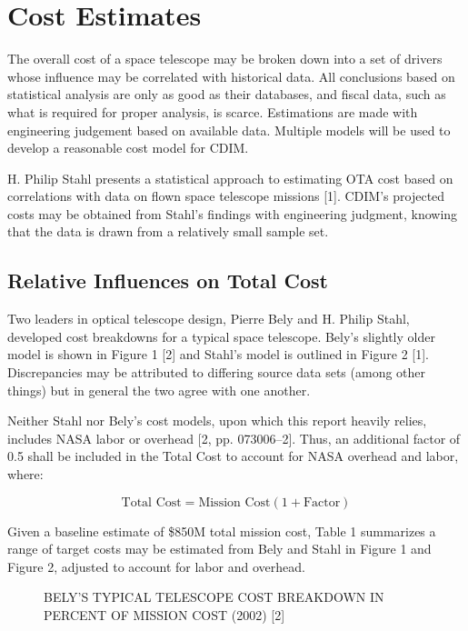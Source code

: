 \documentclass{ws-jai}
\newenvironment{notes}{\color{red}}{}
\begin{document}
\section{Cost Estimates}
\label{sec:cost}
\begin{notes}
The overall cost of a space telescope may be broken down into a set of drivers whose influence may be correlated with historical data.
All conclusions based on statistical analysis are only as good as their databases, and fiscal data, such as what is required for proper analysis, is scarce.
Estimations are made with engineering judgement based on available data. Multiple models will be used to develop a reasonable cost model for CDIM.\@

H. Philip Stahl presents a statistical approach to estimating OTA cost based on correlations with data on flown space telescope missions [1].
CDIM's projected costs may be obtained from Stahl's findings with engineering judgment, knowing that the data is drawn from a relatively small sample set.

\subsection{Relative Influences on Total Cost}
Two leaders in optical telescope design, Pierre Bely and H. Philip Stahl, developed cost breakdowns for a typical space telescope.
Bely's slightly older model is shown in Figure 1 [2] and Stahl's model is outlined in Figure 2 [1].
Discrepancies may be attributed to differing source data sets (among other things) but in general the two agree with one another.

Neither Stahl nor Bely's cost models, upon which this report heavily relies, includes NASA labor or overhead [2, pp. 073006--2].
Thus, an additional factor of 0.5 shall be included in the Total Cost to account for NASA overhead and labor, where:

\begin{equation}
  	\text{Total Cost}=\text{Mission Cost} (1+\text{Factor})
\end{equation}

Given a baseline estimate of \$850M total mission cost, Table 1 summarizes a range of target costs may be estimated from Bely and Stahl in Figure 1 and Figure 2, adjusted to account for labor and overhead.

\begin{figure}
  \caption{BELY'S TYPICAL TELESCOPE COST BREAKDOWN IN PERCENT OF MISSION COST (2002) [2]
\label{fig:bely-cost}
}
\end{figure}


\end{notes}
\end{document}

